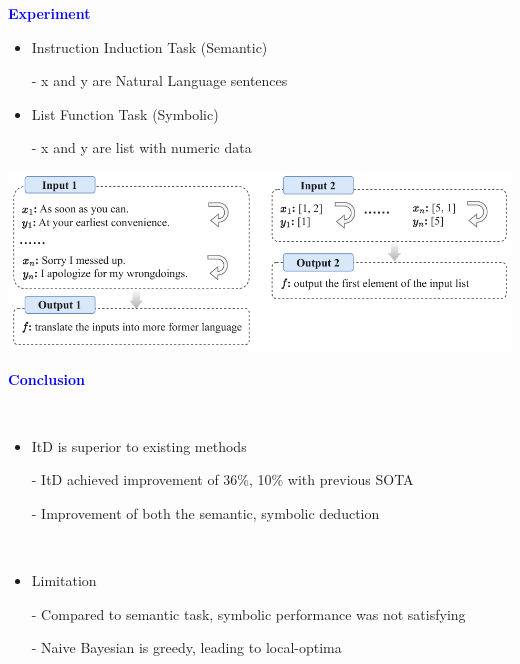 \documentclass[professionalfont]{beamer}
\begin{document}
\begin{frame}
\begin{center}
    { \textbf{\textcolor{blue}{ {\fontsize{12}{14}\selectfont Experiment} }} }
\end{center}

{\fontsize{10}{14}\selectfont 
\begin{itemize}
    \item Instruction Induction Task (Semantic)
    
    - x and y are Natural Language sentences
\end{itemize}

\begin{itemize}
    \item List Function Task (Symbolic)
    
    - x and y are list with numeric data
\end{itemize}
}

\begin{center}
    \includegraphics[width=1.0\textwidth]{figure1.png}
\end{center}

\end{frame}

\begin{frame}
\begin{center}
    { \textbf{\textcolor{blue}{ {\fontsize{12}{14}\selectfont Conclusion} }} }
\end{center}
\\[0.5cm]

{\fontsize{10}{14}\selectfont 
\begin{itemize}
    \item ItD is superior to existing methods
    
    - ItD achieved improvement of 36\%, 10\% with previous SOTA

    - Improvement of both the semantic, symbolic deduction
\end{itemize}
\\[0.5cm]

\begin{itemize}
    \item Limitation
    
    - Compared to semantic task, symbolic performance was not satisfying
    
    - Naive Bayesian is greedy, leading to local-optima
\end{itemize}
}

\end{frame}
\end{document}
